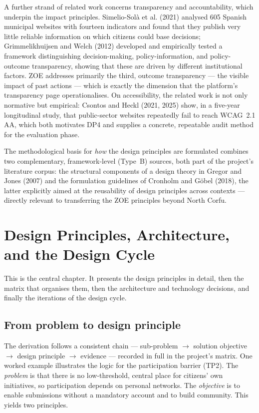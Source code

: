 \documentclass[11pt,a4paper]{article}
\begin{document}
A further strand of related work concerns transparency and accountability, which underpin the impact principles. Simelio-Sol\`a et al. (2021) analysed 605 Spanish municipal websites with fourteen indicators and found that they publish very little reliable information on which citizens could base decisions; Grimmelikhuijsen and Welch (2012) developed and empirically tested a framework distinguishing decision-making, policy-information, and policy-outcome transparency, showing that these are driven by different institutional factors. ZOE addresses primarily the third, outcome transparency --- the visible impact of past actions --- which is exactly the dimension that the platform's transparency page operationalises. On accessibility, the related work is not only normative but empirical: Csontos and Heckl (2021, 2025) show, in a five-year longitudinal study, that public-sector websites repeatedly fail to reach WCAG~2.1 AA, which both motivates DP4 and supplies a concrete, repeatable audit method for the evaluation phase.

The methodological basis for \emph{how} the design principles are formulated combines two complementary, framework-level (Type~B) sources, both part of the project's literature corpus: the structural components of a design theory in Gregor and Jones (2007) and the formulation guidelines of Cronholm and G\"obel (2018), the latter explicitly aimed at the reusability of design principles across contexts --- directly relevant to transferring the ZOE principles beyond North Corfu.

\section{Design Principles, Architecture, and the Design Cycle}

This is the central chapter. It presents the design principles in detail, then the matrix that organises them, then the architecture and technology decisions, and finally the iterations of the design cycle.

\subsection{From problem to design principle}

The derivation follows a consistent chain --- sub-problem $\rightarrow$ solution objective $\rightarrow$ design principle $\rightarrow$ evidence --- recorded in full in the project's matrix. One worked example illustrates the logic for the participation barrier (TP2). The \emph{problem} is that there is no low-threshold, central place for citizens' own initiatives, so participation depends on personal networks. The \emph{objective} is to enable submissions without a mandatory account and to build community. This yields two principles.
\end{document}
